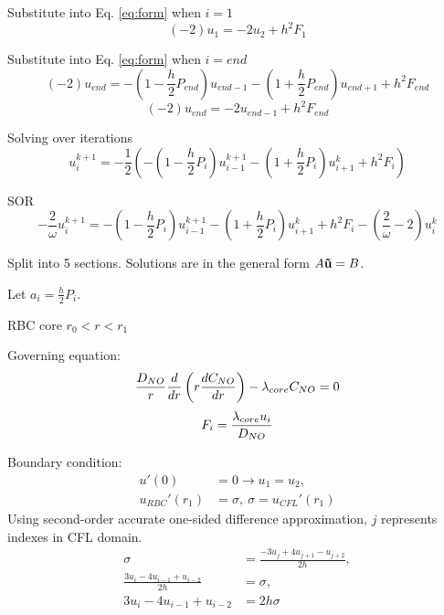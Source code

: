 \documentclass[8pt, a4paper]{article}
\begin{document}
  Substitute into Eq. \eqref{eq:form} when $i=1$
  \begin{equation}
  (-2)u_1=-2u_2+h^2F_1
  \end{equation}
  
  Substitute into Eq. \eqref{eq:form} when $i=end$
  \begin{equation}
  (-2)u_{end}=-\left (1-\frac{h}{2}P_{end} \right)u_{end-1}-\left 
  (1+\frac{h}{2}P_{end} \right)u_{end+1}+h^2F_{end}
  \end{equation}
  \begin{equation}
  (-2)u_{end}=-2u_{end-1}+h^2F_{end}
  \end{equation}
  
  Solving over iterations
  \begin{equation}
  u_i^{k+1} = -\frac{1}{2}\left(-\left (1-\frac{h}{2}P_i 
  \right)u_{i-1}^{k+1}-\left (1+\frac{h}{2}P_i \right)u_{i+1}^k+h^2F_i \right)
  \end{equation}
  
  SOR
  \begin{equation}
  -\frac{2}{\omega}u_i^{k+1} = -\left (1-\frac{h}{2}P_i  
  \right)u_{i-1}^{k+1}-\left (1+\frac{h}{2}P_i \right)u_{i+1}^k+h^2F_i - 
  \left(\frac{2}{\omega}-2 \right)u_i^k
  \end{equation}

  Split into 5 sections. Solutions are in the general form $A\mathbf{\vec{u}}=B$.
  
  Let  $a_i=\frac{h}{2}P_i$.

  RBC core $r_0 < r < r_1$
  
  Governing equation:
  \begin{equation*}
  \frac{D_{NO}}{r}\frac{d}{dr}\left(r\frac{dC_{NO}}{dr}\right)-\lambda_{core}C_{NO}=0
  \end{equation*}
  \begin{equation*}
  F_i = \frac{\lambda_{core}u_i}{D_{NO}}
  \end{equation*}
  
  Boundary condition:
  \begin{align*}
  u'(0)&=0\rightarrow u_1 = u_2,\\
  u_{RBC}'(r_1)&=\sigma,\:\sigma=u_{CFL}'(r_1)
  \end{align*}
  Using second-order accurate one-sided difference approximation, $j$ 
  represents indexes in CFL domain.
  \begin{align*}
  \sigma&=\frac{-3u_j+4u_{j+1}-u_{j+2}}{2h},\\
  \frac{3u_i-4u_{i-1}+u_{i-2}}{2h}&=\sigma,\\
  3u_i-4u_{i-1}+u_{i-2}&=2h\sigma
  \end{align*}
  
\end{document}
